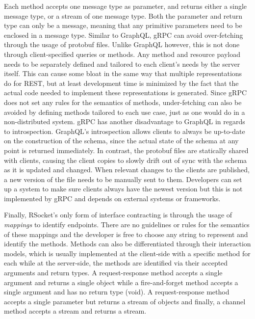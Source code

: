 Each method accepts one message type as parameter, and returns either a single message type, or a stream of one message type. Both the parameter and return type can only be a message, meaning that any primitive parameters need to be enclosed in a message type.
Similar to GraphQL, gRPC can avoid over-fetching through the usage of protobuf files. Unlike GraphQL however, this is not done through client-specified queries or methods. Any method and resource payload needs to be separately defined and tailored to each client's needs by the server itself. This can cause some bloat in the same way that multiple representations do for REST, but at least development time is minimized by the fact that the actual code needed to implement these representations is generated. Since gRPC does not set any rules for the semantics of methods, under-fetching can also be avoided by defining methods tailored to each use case, just as one would do in a non-distributed system.
gRPC has another disadvantage to GraphQL in regards to introspection. GraphQL's introspection allows clients to always be up-to-date on the construction of the schema, since the actual state of the schema at any point is returned immediately. In contrast, the protobuf files are statically shared with clients, causing the client copies to slowly drift out of sync with the schema as it is updated and changed. When relevant changes to the clients are published, a new version of the file needs to be manually sent to them. Developers can set up a system to make sure clients always have the newest version but this is not implemented by gRPC and depends on external systems or frameworks.

Finally, RSocket's only form of interface contracting is through the usage of \textit{mappings} to identify endpoints. There are no guidelines or rules for the semantics of these mappings and the developer is free to choose any string to represent and identify the methods. Methods can also be differentiated through their interaction models, which is usually implemented at the client-side with a specific method for each while at the server-side, the methods are identified via their accepted arguments and return types. A request-response method accepts a single argument and returns a single object while a fire-and-forget method accepts a single argument and has no return type (void). A request-response method accepts a single parameter but returns a stream of objects and finally, a channel method accepts a stream and returns a stream.

